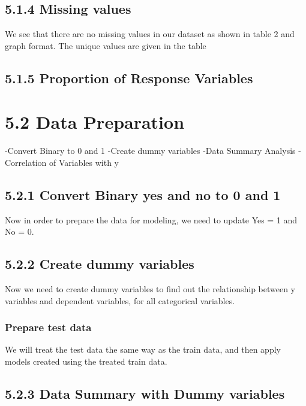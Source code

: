 \documentclass[english,floatsintext,man]{apa6}
\begin{document}
\subsection{5.1.4 Missing values}\label{missing-values}

We see that there are no missing values in our dataset as shown in table
2 and graph format. The unique values are given in the table

\subsection{5.1.5 Proportion of Response
Variables}\label{proportion-of-response-variables}

\section{5.2 Data Preparation}\label{data-preparation}

-Convert Binary to 0 and 1 -Create dummy variables -Data Summary
Analysis -Correlation of Variables with y

\subsection{5.2.1 Convert Binary yes and no to 0 and
1}\label{convert-binary-yes-and-no-to-0-and-1}

Now in order to prepare the data for modeling, we need to update Yes = 1
and No = 0.

\subsection{5.2.2 Create dummy variables}\label{create-dummy-variables}

Now we need to create dummy variables to find out the relationship
between y variables and dependent variables, for all categorical
variables.

\subsubsection{Prepare test data}\label{prepare-test-data}

We will treat the test data the same way as the train data, and then
apply models created using the treated train data.

\subsection{5.2.3 Data Summary with Dummy
variables}\label{data-summary-with-dummy-variables}
\end{document}
